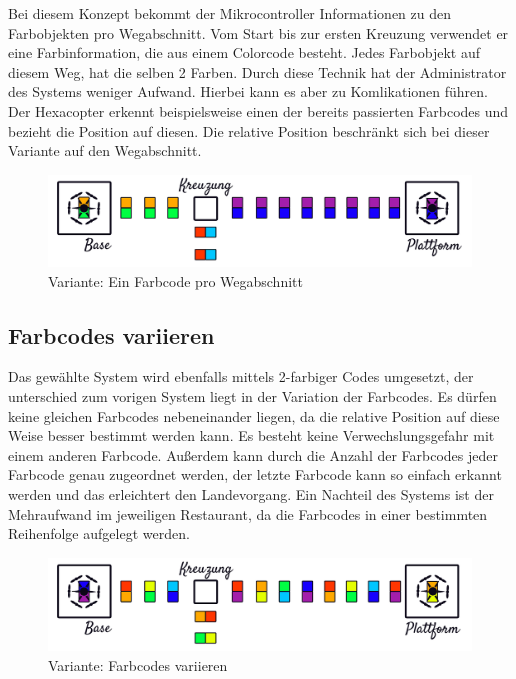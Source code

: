   Bei diesem Konzept bekommt der Mikrocontroller Informationen zu den Farbobjekten pro Wegabschnitt. Vom Start bis zur ersten Kreuzung verwendet er eine Farbinformation, die aus einem Colorcode besteht. Jedes Farbobjekt auf diesem Weg, hat die selben 2 Farben. Durch diese Technik hat der Administrator des Systems weniger Aufwand. Hierbei kann es aber zu Komlikationen führen. Der Hexacopter erkennt beispielsweise einen der bereits passierten Farbcodes und bezieht die Position auf diesen. Die relative Position beschränkt sich bei dieser Variante auf den Wegabschnitt.

    \begin{figure}[H]
      \begin{centering}
        \includegraphics[width = \textwidth]{Bilder/bor_var1}
      \par\end{centering}
      \caption{Variante: Ein Farbcode pro Wegabschnitt}
      \label{Variante1}
    \end{figure}

  \subsection*{Farbcodes variieren}
  Das gewählte System wird ebenfalls mittels 2-farbiger Codes umgesetzt, der unterschied zum vorigen System liegt in der Variation der Farbcodes. Es dürfen keine gleichen Farbcodes nebeneinander liegen, da die relative Position auf diese Weise besser bestimmt werden kann. Es besteht keine Verwechslungsgefahr mit einem anderen Farbcode. Außerdem kann durch die Anzahl der Farbcodes jeder Farbcode genau zugeordnet werden, der letzte Farbcode kann so einfach erkannt werden und das erleichtert den Landevorgang.
  Ein Nachteil des Systems ist der Mehraufwand im jeweiligen Restaurant, da die Farbcodes in einer bestimmten Reihenfolge aufgelegt werden.

      \begin{figure}[H]
      \begin{centering}
        \includegraphics[width = \textwidth]{Bilder/bor_var2}
      \par\end{centering}
      \caption{Variante: Farbcodes variieren}
      \label{Variante2}
    \end{figure}

